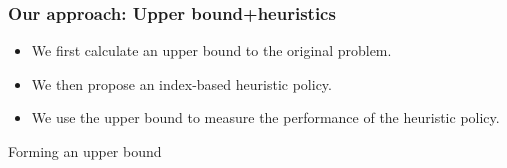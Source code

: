 \documentclass{beamer}
\begin{document}
\begin{frame}
\frametitle{Our approach: Upper bound+heuristics}
\begin{itemize}
\item We first calculate an upper bound to the original problem.
\item We then propose an index-based heuristic policy.
\item We use the upper bound to measure the performance of the heuristic policy.
\end{itemize}
\end{frame}

\begin{frame}{Forming an upper bound}
\end{frame}
\end{document}
